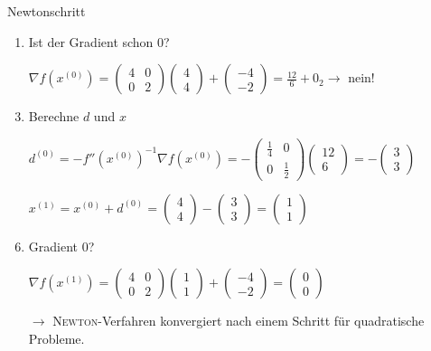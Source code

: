 \begin{Beispiel}{Newtonschritt\\}
\begin{enumerate}
 \item Ist der Gradient schon 0?
 \item[] $\nabla f\left(x^{(0)}\right) = \begin{pmatrix}
4 & 0 \\
0 & 2
\end{pmatrix}\begin{pmatrix}
4 \\
4
\end{pmatrix} + \begin{pmatrix}
-4 \\
-2
\end{pmatrix} = \frac{12}{6} + 0_2 \rightarrow$ nein!
 \item Berechne $d$ und $x$
 \item[] $d^{(0)} = -f''\left(x^{(0)}\right)^{-1}\nabla f\left(x^{(0)}\right) = -\begin{pmatrix}
\frac{1}{4} & 0 \\
0 & \frac{1}{2}
\end{pmatrix}\begin{pmatrix}
12 \\
6
\end{pmatrix} = -\begin{pmatrix}
3 \\
3
\end{pmatrix}$
\item[] $x^{(1)} = x^{(0)} + d^{(0)} = \begin{pmatrix}
4 \\
4
\end{pmatrix} - \begin{pmatrix}
3 \\
3
\end{pmatrix} = \begin{pmatrix}
1 \\
1
\end{pmatrix}$
  \item Gradient 0?
  \item[] $\nabla f\left(x^{(1)}\right) = \begin{pmatrix}
4 & 0 \\
0 & 2
\end{pmatrix} \begin{pmatrix}
1 \\
1
\end{pmatrix} + \begin{pmatrix}
-4 \\
-2
\end{pmatrix} = \begin{pmatrix}
0 \\
0
\end{pmatrix}$ \checkmark
\item[$\rightarrow$] \textsc{Newton}-Verfahren konvergiert nach einem Schritt für quadratische
Probleme.
\end{enumerate}
\end{Beispiel}

